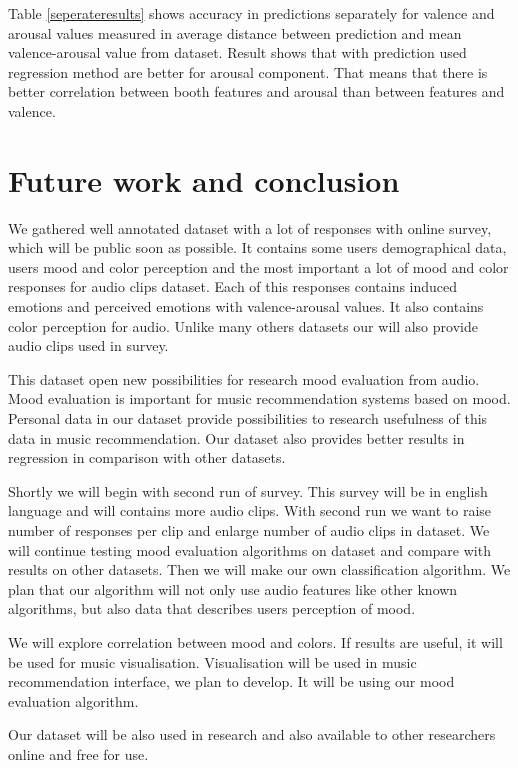 \documentclass[a4paper]{article}
\begin{document}
Table \ref{seperateresults} shows accuracy in predictions separately for valence and arousal values measured in average distance between prediction and mean valence-arousal value from dataset. Result shows that with prediction used regression method are better for arousal component. That means that there is better correlation between booth features and arousal than between features and valence. 

\section{Future work and conclusion}

We gathered well annotated dataset with a lot of responses with online survey, which will be public soon as possible. It contains some users demographical data, users mood and color perception and the most important a lot of mood and color responses for audio clips dataset. Each of this responses contains induced emotions and perceived emotions with valence-arousal values. It also contains color perception for audio. Unlike many others datasets our will also provide audio clips used in survey. 

This dataset open new possibilities for research mood evaluation from audio. Mood evaluation is important for music recommendation systems based on mood. Personal data in our dataset provide possibilities to research usefulness of this data in music recommendation. Our dataset also provides better results in regression in comparison with other datasets.

Shortly we will begin with second run of survey. This survey will be in english language and will contains more audio clips. With second run we want to raise number of responses per clip and enlarge number of audio clips in dataset. We will continue testing mood evaluation algorithms on dataset and compare with results on other datasets. Then we will make our own classification algorithm. We plan that our algorithm will not only use audio features like other known algorithms, but also data that describes users perception of mood.

We will explore correlation between mood and colors. If results are useful, it will be used for music visualisation. Visualisation will be used in music recommendation interface, we plan to develop. It will be using our mood evaluation algorithm. 

Our dataset will be also used in research and also available to other researchers online and free for use. 

{}


\end{document}
